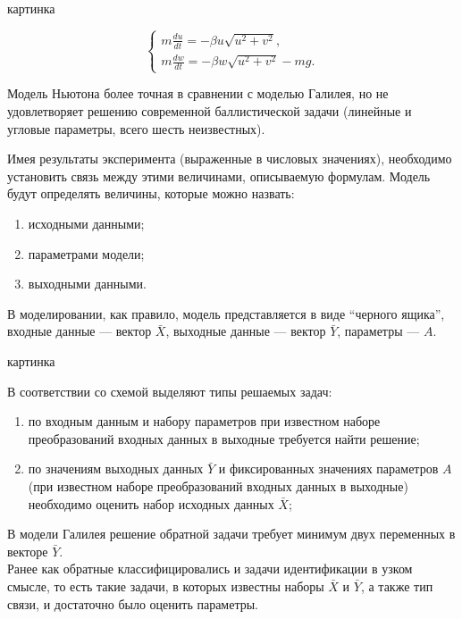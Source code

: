 \documentclass[12pt]{article}
\begin{document}
\begin{center}
    картинка
\end{center}

\[
\begin{cases}
    m \frac{du}{dt} = - \beta u \sqrt{u^2 + v^2},\\
    m \frac{dw}{dt} = - \beta w \sqrt{u^2 + v^2} - mg.
\end{cases}
\]

Модель Ньютона более точная в сравнении с моделью Галилея, но не удовлетворяет решению современной баллистической задачи (линейные и угловые параметры, всего шесть неизвестных).

Имея результаты эксперимента (выраженные в числовых значениях), необходимо установить связь между этими величинами, описываемую формулам. Модель будут определять величины, которые можно назвать:
\begin{enumerate}
    \item исходными данными;
    \item параметрами модели;
    \item выходными данными.
\end{enumerate}

В моделировании, как правило, модель представляется в виде \enquote{черного ящика}, входные данные --- вектор $\bar{X}$, выходные данные --- вектор $\bar{Y}$, параметры --- $A$.

\begin{center}
    картинка
\end{center}

В соответствии со схемой выделяют типы решаемых задач:

\begin{enumerate}
    \item по входным данным и набору параметров при известном наборе преобразований входных данных в выходные требуется найти решение;
    \item по значениям выходных данных $\bar{Y}$ и фиксированных значениях параметров $A$ (при известном наборе преобразований входных данных в выходные) необходимо оценить набор исходных данных $\bar{X}$;
\end{enumerate}

В модели Галилея решение обратной задачи требует минимум двух переменных в векторе $\bar{Y}$.\\

Ранее как обратные классифицировались и задачи идентификации в узком смысле, то есть такие задачи, в которых известны наборы $\bar{X}$ и $\bar{Y}$, а также тип связи, и достаточно было оценить параметры.
\end{document}
